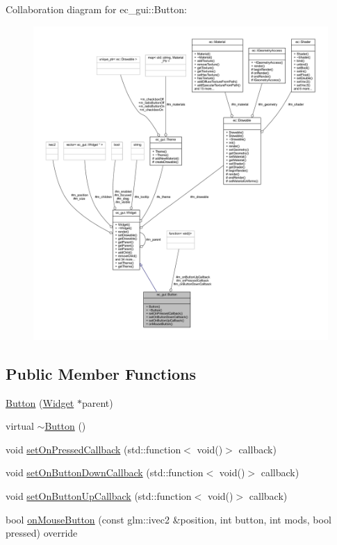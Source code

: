 Collaboration diagram for ec\+\_\+gui\+:\+:Button\+:\nopagebreak
\begin{figure}[H]
\begin{center}
\leavevmode
\includegraphics[width=350pt]{classec__gui_1_1_button__coll__graph}
\end{center}
\end{figure}
\subsection*{Public Member Functions}
\begin{DoxyCompactItemize}
\item 
\mbox{\hyperlink{classec__gui_1_1_button_a179c52041fa20bbfc088020bafc31056}{Button}} (\mbox{\hyperlink{classec__gui_1_1_widget}{Widget}} $\ast$parent)
\item 
virtual \mbox{\hyperlink{classec__gui_1_1_button_a4e6b3dc59f83c39f5f644e8040f7577f}{$\sim$\+Button}} ()
\item 
void \mbox{\hyperlink{classec__gui_1_1_button_a2db872af3725958fafc6c1fe59c7c971}{set\+On\+Pressed\+Callback}} (std\+::function$<$ void()$>$ callback)
\item 
void \mbox{\hyperlink{classec__gui_1_1_button_a41d8f8d496449348e8fa2a3dfc5edaf4}{set\+On\+Button\+Down\+Callback}} (std\+::function$<$ void()$>$ callback)
\item 
void \mbox{\hyperlink{classec__gui_1_1_button_a5031b22c411277ab2625f28d6de4dd49}{set\+On\+Button\+Up\+Callback}} (std\+::function$<$ void()$>$ callback)
\item 
bool \mbox{\hyperlink{classec__gui_1_1_button_aee51b738c759beadb9de9734ca1bde08}{on\+Mouse\+Button}} (const glm\+::ivec2 \&position, int button, int mods, bool pressed) override
\end{DoxyCompactItemize}
